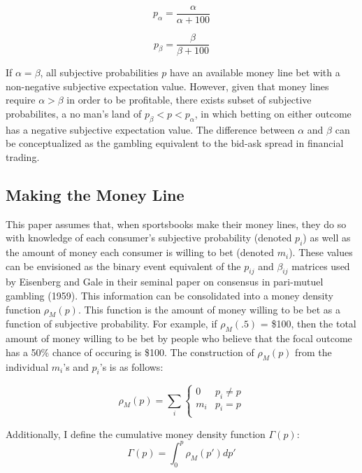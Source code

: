 \documentclass[sn-mathphys-num]{sn-jnl}
\theoremstyle{thmstyleone}%
\theoremstyle{thmstyletwo}%
\theoremstyle{thmstylethree}%
\begin{document}
\begin{equation}
 p_\alpha = \frac{\alpha}{\alpha + 100}      
\end{equation}

\begin{equation}
p_\beta= \frac{\beta}{\beta + 100}      
\end{equation}
\vspace{.05in}

If $\alpha = \beta$, all subjective probabilities $p$ have an available money line bet with a non-negative subjective expectation value. However, given that money lines require $\alpha > \beta$ in order to be profitable, there exists subset of subjective probabilites, a no man's land of $p_{\beta} < p < p_{\alpha}$, in which betting on either outcome has a negative subjective expectation value. The difference between $\alpha$ and $\beta$ can be conceptualized as the gambling equivalent to the bid-ask spread in financial trading.

\subsection{Making the Money Line}

This paper assumes that, when sportsbooks make their money lines, they do so with knowledge of each consumer's subjective probability (denoted $p_{i}$) as well as the amount of money each consumer is willing to bet (denoted $m_{i}$). These values can be envisioned as the binary event equivalent of the $p_{ij}$ and $\beta_{ij}$ matrices used by Eisenberg and Gale in their seminal paper on consensus in pari-mutuel gambling (1959). This information can be consolidated into a money density function $\rho_M(p)$. This function is the amount of money willing to be bet as a function of subjective probability. For example, if $\rho_M(.5)$ = \$100, then the total amount of money willing to be bet by people who believe that the focal outcome has a 50\% chance of occuring is \$100. The construction of $\rho_M(p)$ from the individual $m_i$'s and $p_i$'s is as follows:

\begin{equation}
\rho_M(p) = \sum_{i}
   \begin{cases} 
     0 & p_i \neq p \\
     m_i & p_i = p \\
   \end{cases}
\end{equation}

Additionally, I define the cumulative money density function $\Gamma(p)$:
\begin{equation}
\Gamma(p) = \int_0^p\rho_M(p') dp'
\end{equation}
\end{document}
